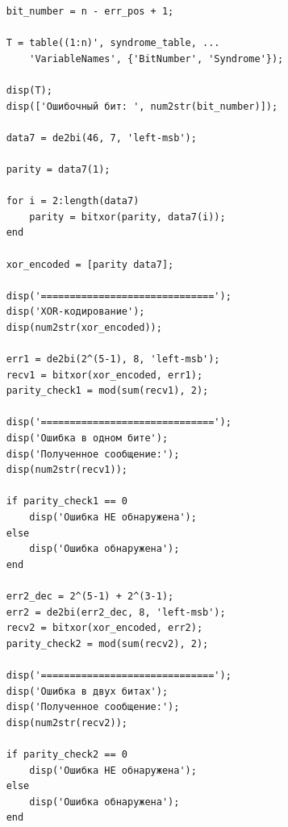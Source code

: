 \documentclass[a4paper, 14pt]{article}
\begin{document}
\begin{verbatim}
    bit_number = n - err_pos + 1;

    T = table((1:n)', syndrome_table, ...
        'VariableNames', {'BitNumber', 'Syndrome'});

    disp(T);
    disp(['Ошибочный бит: ', num2str(bit_number)]);

    data7 = de2bi(46, 7, 'left-msb');

    parity = data7(1);

    for i = 2:length(data7)
        parity = bitxor(parity, data7(i));
    end

    xor_encoded = [parity data7];

    disp('==============================');
    disp('XOR-кодирование');
    disp(num2str(xor_encoded));

    err1 = de2bi(2^(5-1), 8, 'left-msb');
    recv1 = bitxor(xor_encoded, err1);
    parity_check1 = mod(sum(recv1), 2);

    disp('==============================');
    disp('Ошибка в одном бите');
    disp('Полученное сообщение:');
    disp(num2str(recv1));

    if parity_check1 == 0
        disp('Ошибка НЕ обнаружена');
    else
        disp('Ошибка обнаружена');
    end

    err2_dec = 2^(5-1) + 2^(3-1);
    err2 = de2bi(err2_dec, 8, 'left-msb');
    recv2 = bitxor(xor_encoded, err2);
    parity_check2 = mod(sum(recv2), 2);

    disp('==============================');
    disp('Ошибка в двух битах');
    disp('Полученное сообщение:');
    disp(num2str(recv2));

    if parity_check2 == 0
        disp('Ошибка НЕ обнаружена');
    else
        disp('Ошибка обнаружена');
    end
\end{verbatim}
\end{document}
